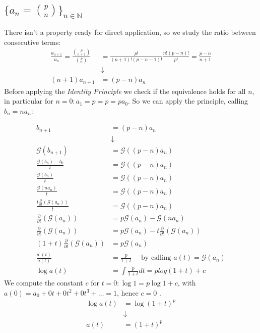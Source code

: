 \subsection{$\{a_n = {{p}\choose{n}} \}_{n \in \mathbb{N} }$}

There isn't a property ready for direct application, so we study the
ratio between consecutive terms:
\begin{displaymath}
  \begin{split}
    \frac{a_{n+1}}{a_n} = \frac{{{p}\choose{n+1}} }{{{p}\choose{n}} }
    &= \frac{p!}{(n+1)!(p-n-1)!} \frac{n!(p-n)!}{p!} = \frac{p-n}{n+1}\\
    &\downarrow \\
    (n+1)a_{n+1} &= (p-n)a_n
  \end{split}
\end{displaymath}
Before applying the \emph{Identity Principle} we check if the
equivalence holds for all $n$, in particular for $n=0: a_1 = p = p =
pa_0$. So we can apply the principle, calling $b_n = n a_n$:

\begin{displaymath}
  \begin{split}
    b_{n+1} &= (p-n)a_n \\
    &\downarrow \\
    \mathcal{G} (b_{n+1}) &= \mathcal{G} ((p-n)a_n)\\
    \frac{\mathcal{G} (b_n) - b_0}{t} &= \mathcal{G} ((p-n)a_n)\\
    \frac{\mathcal{G} (b_n)}{t} &= \mathcal{G} ((p-n)a_n)\\
    \frac{\mathcal{G} (n a_n)}{t} &= \mathcal{G} ((p-n)a_n)\\
    \frac{t\frac{\partial}{\partial t}\left( \mathcal{G} (a_n)
      \right) }{t} &= \mathcal{G} ((p-n)a_n)\\
    \frac{\partial}{\partial t}\left( \mathcal{G} (a_n) \right) &=
    p\mathcal{G} (a_n) - \mathcal{G} (n a_n)\\
    \frac{\partial}{\partial t}\left( \mathcal{G} (a_n) \right) &=
    p\mathcal{G} (a_n) - t \frac{\partial}{\partial t}\left(
      \mathcal{G} (a_n) \right)\\
    (1+t)\frac{\partial}{\partial t}\left( \mathcal{G} (a_n) \right)
    &=    p\mathcal{G} (a_n) \\
    \frac{a^\prime(t)}{a(t)} &= \frac{p}{1+t} \quad \text{ by calling
    }
    a(t) = \mathcal{G} (a_n)\\
    \log a(t) &= \int{ \frac{p}{1+t}dt} = p log{(1+t)} + c
  \end{split}
\end{displaymath}
We compute the constant $c$ for $t=0: \log 1 = p \log 1 + c$, with
$a(0) = a_0 + 0t+0t^2 + 0t^3+\ldots = 1$, hence $c=0$ .
\begin{displaymath}
  \begin{split}
    \log{a(t)} &= \log{(1+t)}^p\\
    &\downarrow \\
    a(t) &= (1+t)^p
  \end{split}
\end{displaymath}

